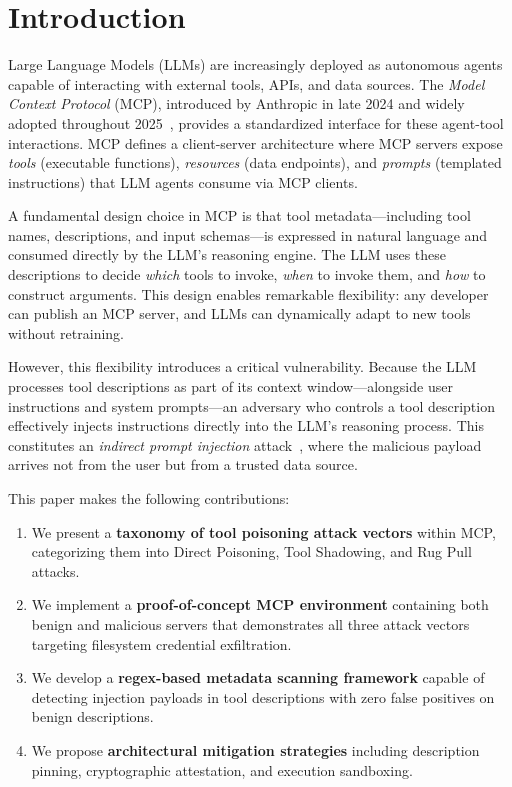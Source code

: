 \documentclass[conference]{IEEEtran}
\begin{document}
\section{Introduction}
\label{sec:introduction}

Large Language Models (LLMs) are increasingly deployed as autonomous agents capable of interacting with external tools, APIs, and data sources. The \textit{Model Context Protocol} (MCP), introduced by Anthropic in late 2024 and widely adopted throughout 2025~\cite{errico2025securing}, provides a standardized interface for these agent-tool interactions. MCP defines a client-server architecture where MCP servers expose \textit{tools} (executable functions), \textit{resources} (data endpoints), and \textit{prompts} (templated instructions) that LLM agents consume via MCP clients.

A fundamental design choice in MCP is that tool metadata—including tool names, descriptions, and input schemas—is expressed in natural language and consumed directly by the LLM's reasoning engine. The LLM uses these descriptions to decide \textit{which} tools to invoke, \textit{when} to invoke them, and \textit{how} to construct arguments. This design enables remarkable flexibility: any developer can publish an MCP server, and LLMs can dynamically adapt to new tools without retraining.

However, this flexibility introduces a critical vulnerability. Because the LLM processes tool descriptions as part of its context window—alongside user instructions and system prompts—an adversary who controls a tool description effectively injects instructions directly into the LLM's reasoning process. This constitutes an \textit{indirect prompt injection} attack~\cite{greshake2023not}, where the malicious payload arrives not from the user but from a trusted data source.

This paper makes the following contributions:

\begin{enumerate}[leftmargin=*]
    \item We present a \textbf{taxonomy of tool poisoning attack vectors} within MCP, categorizing them into Direct Poisoning, Tool Shadowing, and Rug Pull attacks.
    \item We implement a \textbf{proof-of-concept MCP environment} containing both benign and malicious servers that demonstrates all three attack vectors targeting filesystem credential exfiltration.
    \item We develop a \textbf{regex-based metadata scanning framework} capable of detecting injection payloads in tool descriptions with zero false positives on benign descriptions.
    \item We propose \textbf{architectural mitigation strategies} including description pinning, cryptographic attestation, and execution sandboxing.
\end{enumerate}
\end{document}
